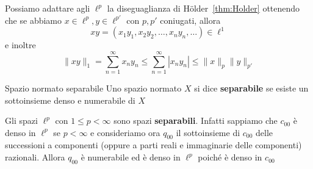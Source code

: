 Possiamo adattare agli \(\ell^{p}\) la diseguaglianza di Hölder~\ref{thm:Holder}
ottenendo che se abbiamo \(x \in \ell^{p}, y \in \ell^{p'}\) con \(p, p'\)
coniugati, allora
\[
  xy = {(x_{1}y_{1}, x_{2}y_{2}, \dots, x_{n}y_{n}, \dots)} \in \ell^{1} 
\]
e inoltre
\[
  \|xy\|_1 = \sum_{n=1}^{\infty} x_{n}y_{n} \le \sum_{n=1}^{\infty} |x_{n}y_{n}| \le
  \|x\|_p \|y\|_{p'} 
\]
\begin{definition}{Spazio normato separabile}\label{def:separabile}
    Uno spazio normato \(X\) si dice \textbf{separabile} se esiste un sottoinsieme
    denso e numerabile di \(X\)
\end{definition}

Gli spazi \(\ell^{p}\) con \(1 \le p < \infty\) sono spazi \textbf{separabili}.
Infatti sappiamo che \(c_{00}
\) è denso in \(\ell^{p}\) se \(p < \infty\) e consideriamo ora \(q_{00} \) il
sottoinsieme di \(c_{00}\) delle successioni a componenti (oppure a parti reali
e immaginarie delle componenti) razionali. Allora \(q_{00} \) è numerabile ed è
denso in \(\ell^{p}\) poiché è denso in \(c_{00}\) 

